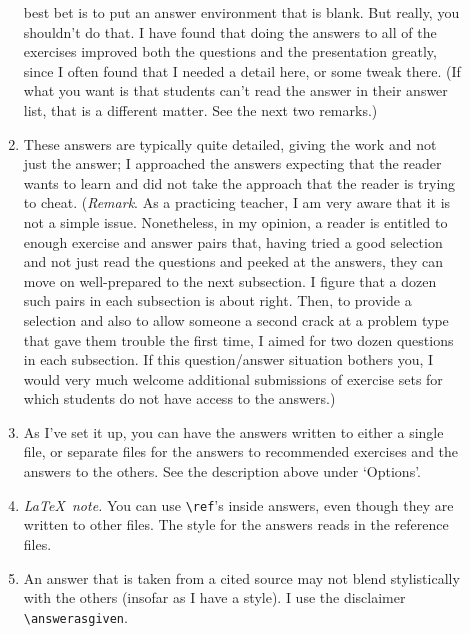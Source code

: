 \documentclass[titlepage]{article}
\newcommand{\latexnote}{\textit{\LaTeX\ note.} }
\begin{document}
\begin{description}
\begin{enumerate}
        best bet is to put an answer environment that is blank.
        But really, you shouldn't do that. 
        I have found that doing the answers to all of the exercises
        improved both the questions and the presentation greatly,
        since I often found that I needed a detail here, or
        some tweak there.  
        (If what you want is that students can't read the answer in their
        answer list, that is a different matter.
        See the next two remarks.)
      \item
         These answers are typically quite detailed, giving the work
         and not just the answer; I approached the answers 
         expecting that the reader wants to learn
         and did not take the
         approach that the reader is trying to cheat.
         (\textit{Remark}.
         As a practicing teacher, I am very aware that it is not a simple
         issue.
         Nonetheless, in my opinion, a reader is 
         entitled to enough exercise and answer pairs that,
         having tried a good selection and not just read the questions 
         and peeked at the answers,
         they can move on well-prepared to the next subsection.
         I figure that a dozen such pairs in each subsection is
         about right.
         Then, to provide a selection and also to allow someone 
         a second crack at a problem type that gave them trouble the 
         first time, I aimed for two dozen
         questions in each subsection.
         If this question/answer situation bothers you, 
         I would very much welcome additional submissions of 
         exercise sets for which students do not have access
         to the answers.)  
     \item 
         As I've set it up, you can have the answers written to either 
         a single file,
         or separate files for the answers to recommended exercises and
         the answers to the others.
         See the description above under `Options'.
      \item
         \latexnote
         You can use \verb|\ref|'s inside answers, even though they
         are written to other files.
         The style for the answers reads in the reference files.
      \item
         An answer that is taken from a cited source may not blend 
         stylistically with the others (insofar as I have a style).
         I use the disclaimer \verb|\answerasgiven|.
    \end{enumerate}



\end{description}
\end{document}
